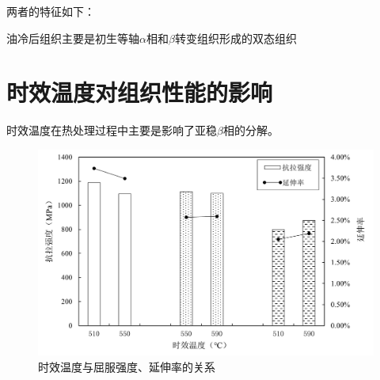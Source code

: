 两者的特征如下：

油冷后组织主要是初生等轴$\alpha$相和$\beta$转变组织形成的双态组织



\section{时效温度对组织性能的影响}
时效温度在热处理过程中主要是影响了亚稳$\beta $相的分解。
\begin{figure}[h!]
	\centering
	\includegraphics[width=1\linewidth]{pic/时效温度与屈服强度、延伸率的关系}
	\caption{时效温度与屈服强度、延伸率的关系}
	\label{fig:sqy}
\end{figure}


